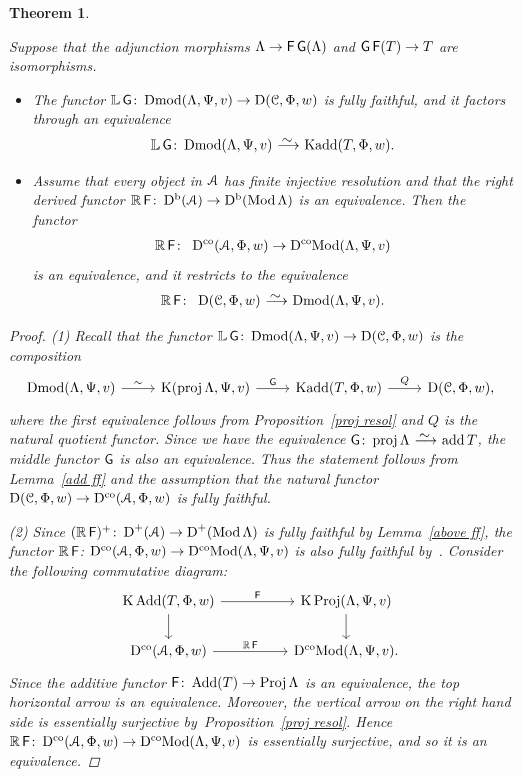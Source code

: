 \documentclass[pdftex]{sigma}%
\newtheorem{thm}[dfn]{Theorem}
\numberwithin{equation}{section}
\newcommand{\Kadd}{\operatorname{Kadd}}
\newcommand{\Dmod}{\operatorname{Dmod}}
\newcommand{\DcoMod}{\operatorname{D^{co}\hspace{-0.1mm}Mod}}
\newcommand{\Mod}{\operatorname{Mod}}
\newcommand{\Proj}{\operatorname{Proj}}
\newcommand{\add}{\operatorname{add}}
\newcommand{\Add}{\operatorname{Add}}
\newcommand{\proj}{\operatorname{proj}}
\newcommand{\Db}{\operatorname{D^b}}
\newcommand{\Dco}{\operatorname{D^{co}}}
\newcommand{\D}{\operatorname{D}}
\newcommand{\K}{\operatorname{K}}
\newcommand{\bL}{\mathbb{L}}
\newcommand{\bR}{\mathbb{R}}
\newcommand{\scrA}{\EuScript{A}}
\newcommand{\scrC}{\EuScript{C}}
\newcommand{\F}{\operatorname{\sf{F}}}
\newcommand{\G}{\operatorname{\sf{G}}}
\newcommand{\simto}{\,\,\,\,\raisebox{4pt}{$\sim$}{\kern -1.1em \longrightarrow}\,}
\begin{document}
\begin{thm}\label{main thm}

Suppose that the adjunction morphisms $\Lambda\to \F\G(\Lambda)$ and $\G\F(T)\to T$ are isomorphisms.
\begin{itemize}\itemsep=0pt
\item[$1.$] The functor $\bL \G\colon \Dmod(\Lambda,\Psi,v)\to \D(\scrC,\Phi,w)$ is fully faithful, and it factors through an equivalence
\begin{gather*}
\bL \G\colon \Dmod(\Lambda,\Psi,v)\simto \Kadd(T,\Phi,w).
\end{gather*}

\item[$2.$]Assume that every object in $\scrA$ has finite injective resolution and that the right derived functor $\bR \F\colon\Db(\scrA)\to\Db(\Mod\Lambda)$ is an equivalence. Then the functor
\begin{gather*}
\bR \F\colon\ \Dco(\scrA,\Phi,w)\to \DcoMod(\Lambda,\Psi,v)
\end{gather*}
is an equivalence, and it restricts to the equivalence
\begin{gather*}
\bR \F\colon\ \D(\scrC,\Phi,w)\simto \Dmod(\Lambda,\Psi,v).
\end{gather*}
\end{itemize}
\begin{proof}
(1) Recall that the functor $\bL\G\colon\Dmod(\Lambda,\Psi,v)\to \D(\scrC,\Phi,w)$ is the composition
\[
\begin{tikzcd}
\Dmod(\Lambda,\Psi,v)\arrow[r,"\sim"]&\K(\proj\Lambda,\Psi,v)\arrow[r,"\G"] &\Kadd(T,\Phi,w)\arrow[r,"Q"]&\D(\scrC,\Phi,w),
\end{tikzcd}
\]
where the first equivalence follows from Proposition~\ref{proj resol} and $Q$ is the natural quotient functor. Since we have the equivalence $\G\colon \proj\Lambda\simto \add T$, the middle functor $\G$ is also an equivalence. Thus the statement follows from Lemma~\ref{add ff} and the assumption that the natural functor $\D(\scrC,\Phi,w)\to \Dco(\scrA,\Phi,w)$ is fully faithful.


(2) Since $(\bR \F)^+\colon\D^+(\scrA)\to\D^+(\Mod\Lambda)$ is fully faithful by Lemma~\ref{above ff}, the functor $\bR \F $: $\Dco(\scrA,\Phi,w)\to \DcoMod(\Lambda,\Psi,v)$ is also fully faithful by~\cite[Lemma~4.11]{bdfik}. Consider the following commutative diagram:
\[
\begin{tikzcd}
\K\Add(T,\Phi,w)\arrow[rr, "\F"]\arrow[d, ]&&\K\Proj(\Lambda,\Psi,v)\arrow[d, ]\\
\Dco(\scrA,\Phi,w)\arrow[rr, "\bR \F"]&&\DcoMod(\Lambda,\Psi,v).
\end{tikzcd}
\]
Since the additive functor $\F\colon\Add(T)\to \Proj\Lambda$ is an equivalence, the top horizontal arrow is an equivalence. Moreover, the vertical arrow on the right hand side is essentially surjective by~Proposition~\ref{proj resol}. Hence $\bR \F\colon\Dco(\scrA,\Phi,w)\to \DcoMod(\Lambda,\Psi,v)$ is essentially surjective, and so it is an equivalence.


\end{proof}
\end{thm}
\end{document}

